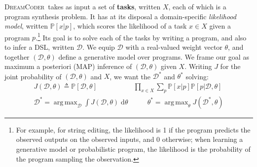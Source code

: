 \documentclass{article}
\newcommand{\system}{\textsc{DreamCoder}~}
\DeclareMathOperator*{\argmax}{arg\,max} %
\newcommand{\probability}{\mathds{P}} %
\begin{document}
\system takes as input a set of \textbf{tasks}, written $X$, each of which is a program synthesis problem.
It has at its disposal a domain-specific \emph{likelihood model}, written $\probability[x|p]$, which scores the likelihood of a task $x\in X$ given a program $p$.\footnote{For example, for string editing,
  the likelihood is 1 if the program predicts the observed outputs on the observed inputs,
  and 0 otherwise; when learning a generative model or probabilistic program, the likelihood is
the probability of the program sampling the observation.}
Its goal is to solve each of the tasks by writing a program,
and also to infer a DSL, written $\mathcal{D}$.
We equip $\mathcal{D}$ with a real-valued weight vector $\theta$, and together
$(\mathcal{D},\theta)$ define a generative model over programs.
We frame our goal as maximum a posteriori (MAP) inference of $(\mathcal{D},\theta)$ given $X$.
Writing $J$ for the joint probability of $(\mathcal{D},\theta)$ and $X$, we want the $\mathcal{D}^*$ and $\theta^*$ solving:
\begin{align}\label{intractableObjectives}
\nonumber  J(\mathcal{D},\theta)\triangleq \probability[\mathcal{D},\theta]&\prod_{x\in X} \sum_p \probability[x|p]\probability[p|\mathcal{D},\theta]\\
  \mathcal{D}^* = \argmax_{\mathcal{D}}\int J(\mathcal{D},\theta)\;\mathrm{d}\theta &\qquad
  \theta^* =\argmax_\theta J(\mathcal{D}^*,\theta)
\end{align}

\end{document}
